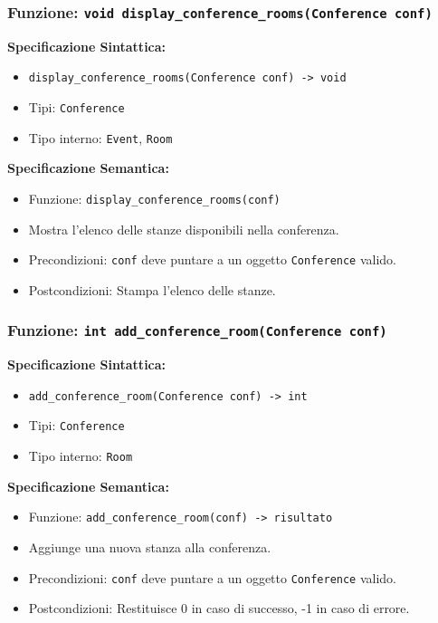 \documentclass[11pt]{scrartcl} %
\begin{document}
\subsubsection{Funzione: \texttt{void display\_conference\_rooms(Conference conf)}}

\textbf{Specificazione Sintattica:}
\begin{itemize}
\item \texttt{display\_conference\_rooms(Conference conf) -> void}
\item Tipi: \texttt{Conference}
\item Tipo interno: \texttt{Event}, \texttt{Room}
\end{itemize}

\textbf{Specificazione Semantica:}
\begin{itemize}
\item Funzione: \texttt{display\_conference\_rooms(conf)}
\item Mostra l'elenco delle stanze disponibili nella conferenza.
\item Precondizioni: \texttt{conf} deve puntare a un oggetto \texttt{Conference} valido.
\item Postcondizioni: Stampa l'elenco delle stanze.
\end{itemize}

\subsubsection{Funzione: \texttt{int add\_conference\_room(Conference conf)}}

\textbf{Specificazione Sintattica:}
\begin{itemize}
\item \texttt{add\_conference\_room(Conference conf) -> int}
\item Tipi: \texttt{Conference}
\item Tipo interno: \texttt{Room}
\end{itemize}

\textbf{Specificazione Semantica:}
\begin{itemize}
\item Funzione: \texttt{add\_conference\_room(conf) -> risultato}
\item Aggiunge una nuova stanza alla conferenza.
\item Precondizioni: \texttt{conf} deve puntare a un oggetto \texttt{Conference} valido.
\item Postcondizioni: Restituisce 0 in caso di successo, -1 in caso di errore.
\end{itemize}
\end{document}
